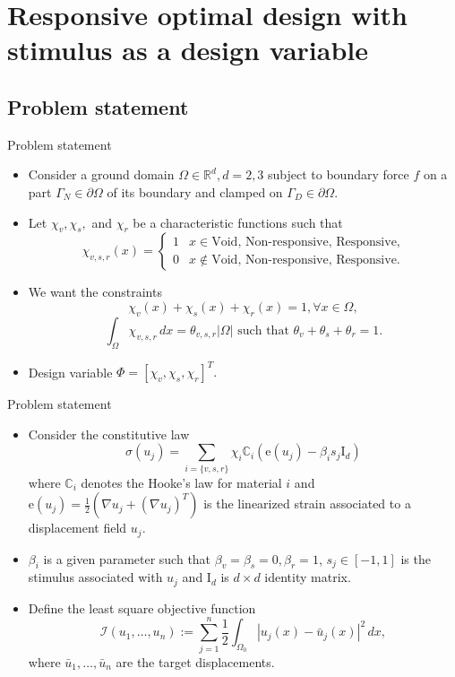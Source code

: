 \documentclass{beamer}
\newcommand{\RR}{\mathbb{R}}
\newcommand{\ee}{\mathrm{e}}
\newcommand{\OO}{\Omega}
\begin{document}
\section{Responsive optimal design with stimulus as a design variable}
\subsection{Problem statement}
\begin{frame}{Problem statement}
\begin{itemize}
    \item Consider a ground domain $\Omega \in \RR^d,d=2,3$ subject to boundary force 
    $f$ on a part $\Gamma_N \in \partial \OO$ of its boundary and clamped 
    on $\Gamma_D \in \partial \OO.$
    \bigskip

    \item Let $\chi_v, \chi_s,$ and $\chi_r$ be a characteristic functions such that 
        \[ \chi_{v,s,r}(x)= \begin{cases} 
            1 & x \in \text{Void, Non-responsive, Responsive,}\\
            0 & x \notin \text{Void, Non-responsive, Responsive.}
        \end{cases}
        \]
    \bigskip
    \item We want the constraints $$\chi_v(x)+\chi_s(x)+\chi_r(x)=1,\forall {x \in \OO},$$
    $$\int_\OO \chi_{v,s,r}\, dx = \theta_{v,s,r}|\OO| \text{ such that }\theta_v + \theta_s + \theta_r = 1.$$
    \bigskip
    \item Design variable $\Phi=[\chi_v,\chi_s,\chi_r]^T.$
\end{itemize}
\end{frame}


\begin{frame}{Problem statement}
    \begin{itemize}
        \item Consider the constitutive law
        $$\sigma(u_j) = \sum_{i=\{v,s,r\}}\chi_i\mathbb{C}_i \left(\ee(u_j) - \beta_i s_j\mathrm{I}_d\right)$$
        where $\mathbb{C}_i$ denotes the Hooke's law for material $i$ and $\ee(u_j)=\frac{1}{2}(\nabla u_j + (\nabla u_j)^T)$ 
        is the linearized strain associated to a displacement field $u_j$.
        \bigskip
        \item $\beta_i$ is a given parameter such that $\beta_v=\beta_s=0, \beta_r=1$, $s_j \in [-1,1]$ is the stimulus associated with $u_j$ and $\mathrm{I}_d$ is $d \times d$ identity matrix.
        \bigskip
        \item Define the least square objective function
        \begin{equation}
            \label{eq:objectiveFunctionNoPerimeter}
            \mathcal{I}(u_1,\dots,u_n) := \sum_{j=1}^n\frac{1}{2}\int_{\OO_0} |u_j(x) - \bar{u}_j(x)|^2\, dx,
        \end{equation}
        where $\bar{u}_1,\ldots,\bar{u}_n$ are the target displacements.
    \end{itemize}
\end{frame}
\end{document}

